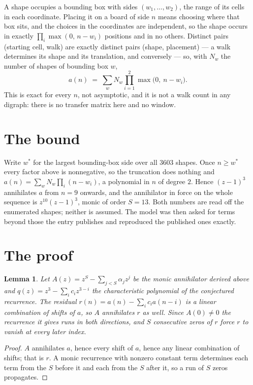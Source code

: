 \documentclass[11pt,a4paper]{article}
\theoremstyle{plain}
\newtheorem{lemma}[theorem]{Lemma}
\theoremstyle{definition}
\begin{document}
A shape occupies a bounding box with sides $(w_1,\dots,w_{2})$, the range of its cells in each
coordinate. Placing it on a board of side $n$ means choosing where that box sits, and the
choices in the coordinates are independent, so the shape occurs in exactly
$\prod_{i}\max(0,\,n-w_i)$ positions and in no others. Distinct pairs (starting cell,
walk) are exactly distinct pairs (shape, placement) --- a walk determines its shape and its
translation, and conversely --- so, with $N_w$ the number of shapes of bounding box $w$,
\[
a(n)\;=\;\sum_{w} N_w \prod_{i=1}^{2}\max\bigl(0,\ n-w_i\bigr).
\]
This is exact for every $n$, not asymptotic, and it is not a walk count in any digraph: there is
no transfer matrix here and no window.

\section{The bound}

Write $w^\ast$ for the largest bounding-box side over all $3603$ shapes. Once $n\ge w^\ast$
every factor above is nonnegative, so the truncation does nothing and
$a(n)=\sum_w N_w\prod_i(n-w_i)$, a polynomial in $n$ of degree $2$. Hence $(z-1)^{3}$
annihilates $a$ from $n=9$ onwards, and the annihilator in force on the whole sequence is
$z^{10}(z-1)^{3}$, monic of order $S=13$. Both numbers are read off the enumerated
shapes; neither is assumed. The model was then asked for terms beyond those the entry publishes
and reproduced the published ones exactly.

\section{The proof}

\begin{lemma}\label{lem:crit}
Let $A(z)=z^S-\sum_{j<S}\alpha_jz^{j}$ be the monic annihilator derived above and
$q(z)=z^{3}-\sum_ic_iz^{3-i}$ the characteristic polynomial of the conjectured
recurrence. The residual $r(n)=a(n)-\sum_ic_ia(n-i)$ is a linear combination of shifts of $a$,
so $A$ annihilates $r$ as well. Since $A(0)\ne0$ the recurrence it gives runs in both
directions, and $S$ consecutive zeros of $r$ force $r$ to vanish at every later index.
\end{lemma}

\begin{proof}
$A$ annihilates $a$, hence every shift of $a$, hence any linear combination of shifts; that is
$r$. A monic recurrence with nonzero constant term determines each term from the $S$ before it
and each from the $S$ after it, so a run of $S$ zeros propagates.
\end{proof}
\end{document}
